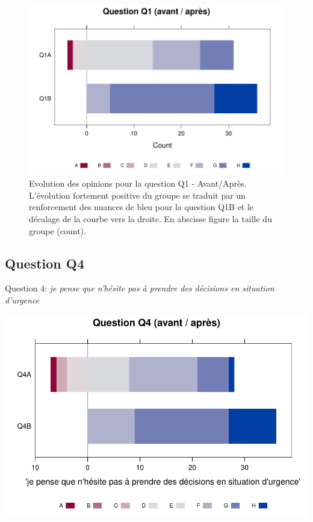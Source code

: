 \documentclass[12pt,english,french]{article}\usepackage{graphicx, color}
\makeatletter
\def\maxwidth{ %
  \ifdim\Gin@nat@width>\linewidth
    \linewidth
  \else
    \Gin@nat@width
  \fi
}
\newenvironment{knitrout}{}{} %
\makeatother
\begin{document}
\begin{figure}
\begin{center}
\begin{knitrout}
\color{fgcolor}
\includegraphics[width=\maxwidth]{figure/likert_Q1} 

\end{knitrout}

\end{center}
\caption{Evolution des opinions pour la question Q1 - Avant/Après. L'évolution fortement positive du groupe se traduit par un renforcement des nuances de bleu pour la question Q1B et le décalage de la courbe vers la droite. En abscisse figure la taille du groupe (count).}
\label{Q1_likert}
\end{figure}

\subsection{ Question Q4}

Question 4: \emph{je pense que n'hésite pas à prendre des décisions en situation d'urgence}

\begin{knitrout}
\color{fgcolor}
\includegraphics[width=\maxwidth]{figure/q4} 

\end{knitrout}
\end{document}
